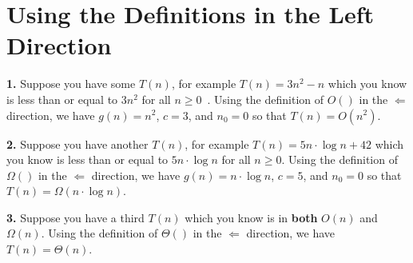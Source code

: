 
{\chapter{Using the Definitions in the Left Direction}}

{\bf{1.}} Suppose you have some $T(n)$, for example $T(n) = 3n^2 - n$
which you know is less than or equal to $3n^2$ for all
$n \ge 0$~\cite{whole-journal}.
Using the definition of $O()$ in the $\Leftarrow$ direction,
we have $g(n) = n^2$, $c = 3$, and $n_0 = 0$ so that $T(n) = O(n^2)$.

\vspace*{2em}

{\bf{2.}} Suppose you have another $T(n)$,
for example $T(n) = 5n{\cdot}\log{n} + 42$
which you know is less than or equal to
$5n{\cdot}\log{n}$
for all $n \ge 0$.
Using the definition of $\Omega()$ in the $\Leftarrow$ direction,
we have $g(n) = n{\cdot}\log{n}$,
$c = 5$, and $n_0 = 0$ so that $T(n) = \Omega(n{\cdot}\log{n})$.

\vspace*{2em}

{\bf{3.}} Suppose you have a third $T(n)$
which you know is in {\bf{both}} $O(n)$ and $\Omega(n)$.
Using the definition of $\Theta()$ in the $\Leftarrow$ direction,
we have $T(n) = \Theta(n)$.


